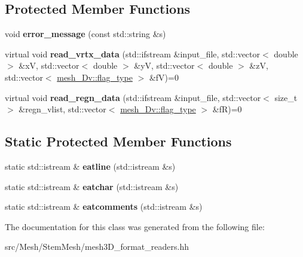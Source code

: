 \subsection*{Protected Member Functions}
\begin{DoxyCompactItemize}
\item 
\mbox{\label{classStemMesh3D_1_1mesh3D__reader_a67dd32389104f45a0e846318f131d371}} 
void {\bfseries error\+\_\+message} (const std\+::string \&s)
\item 
\mbox{\label{classStemMesh3D_1_1mesh3D__reader_a49552bdac73d0e0156e0bac1b9b914b9}} 
virtual void {\bfseries read\+\_\+vrtx\+\_\+data} (std\+::ifstream \&input\+\_\+file, std\+::vector$<$ double $>$ \&xV, std\+::vector$<$ double $>$ \&yV, std\+::vector$<$ double $>$ \&zV, std\+::vector$<$ \hyperlink{classStemMesh3D_1_1mesh__3Dv_a9544cba555b60f17f04fcd1689314338}{mesh\+\_\+Dv\+::flag\+\_\+type} $>$ \&fV)=0
\item 
\mbox{\label{classStemMesh3D_1_1mesh3D__reader_a108c6a647a67014a09120cb46a971d5d}} 
virtual void {\bfseries read\+\_\+regn\+\_\+data} (std\+::ifstream \&input\+\_\+file, std\+::vector$<$ size\+\_\+t $>$ \&regn\+\_\+vlist, std\+::vector$<$ \hyperlink{classStemMesh3D_1_1mesh__3Dv_a9544cba555b60f17f04fcd1689314338}{mesh\+\_\+Dv\+::flag\+\_\+type} $>$ \&fR)=0
\end{DoxyCompactItemize}
\subsection*{Static Protected Member Functions}
\begin{DoxyCompactItemize}
\item 
\mbox{\label{classStemMesh3D_1_1mesh3D__reader_ab094d54022615427f5f5cf4ea04b2cb9}} 
static std\+::istream \& {\bfseries eatline} (std\+::istream \&s)
\item 
\mbox{\label{classStemMesh3D_1_1mesh3D__reader_aa14b098edf06fedc72676af589ca8684}} 
static std\+::istream \& {\bfseries eatchar} (std\+::istream \&s)
\item 
\mbox{\label{classStemMesh3D_1_1mesh3D__reader_ab09cc7c2ed6ffa191f45e87f136168e0}} 
static std\+::istream \& {\bfseries eatcomments} (std\+::istream \&s)
\end{DoxyCompactItemize}


The documentation for this class was generated from the following file\+:\begin{DoxyCompactItemize}
\item 
src/\+Mesh/\+Stem\+Mesh/mesh3\+D\+\_\+format\+\_\+readers.\+hh\end{DoxyCompactItemize}
